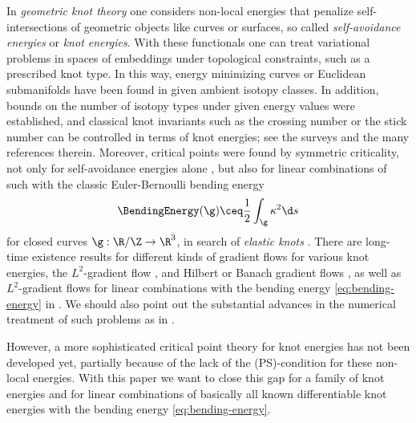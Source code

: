 In \emph{geometric knot theory} one considers non-local energies that
penalize self-inter\-sec\-tions of geometric objects like curves or surfaces, 
so called \emph{self-avoidance energies} or \emph{knot energies}.
With these functionals one can treat variational problems in spaces of
embeddings under topological constraints, such as a prescribed knot type.
In this way, energy minimizing curves or Euclidean submanifolds have been
found in given ambient isotopy classes. In addition, bounds on the number of
isotopy types under given energy values were established, and classical knot
invariants such as the crossing number or the stick number can be controlled
in terms of knot energies; see the surveys 
\cite{ohara_2003,strzelecki-etal_2013a,
strzelecki-vdm_2013a,strzelecki-vdm_2014,blatt-reiter_2014,strzelecki-vdm_2018} 
and the many references 
therein. Moreover, critical points
were found by 
symmetric criticality, not only for self-avoidance energies   alone
\cite{cantarella-etal_2014b,gilsbach-vdm_2018,wings_2025}, 
but also for linear combinations of such
with the classic Euler-Bernoulli bending energy
\begin{equation}\label{eq:bending-energy}
        \BendingEnergy(\g) \ceq \frac{1}{2} \int_\g\kappa^2\d s
\end{equation}
for closed curves $\g:\R/\Z\to\R^3$, in search of \emph{elastic knots}
\cite{gerlach-etal_2017,gilsbach-etal_2023}. There are long-time existence
results for different kinds of  gradient flows for various knot energies, the 
$L^2$-gradient flow 
\cite{blatt_2012b,blatt_2018,blatt_2020a}, and Hilbert or Banach gradient flows
\cite{knappmann-etal_2023,matt-etal_2023}, as well as
$L^2$-gradient flows
for linear combinations with the bending energy \cref{eq:bending-energy}
in \cite{lin-schwetlick_2010,vonbrecht-blair_2017}. We should also point
out the substantial advances in the numerical treatment of such 
problems as in 
\cite{bartels-etal_2018,bartels-reiter_2020,bartels-reiter_2021,yu-etal_2021b,yu-etal_2021,sassen-etal_2024}.

However, a more sophisticated critical point theory for knot energies
has not been developed yet, partially because of the lack of the (PS)-condition
for these non-local energies. With this paper we want to close this gap
for a family of knot energies and for linear combinations of basically
all known differentiable knot energies
with the bending energy \cref{eq:bending-energy}.

